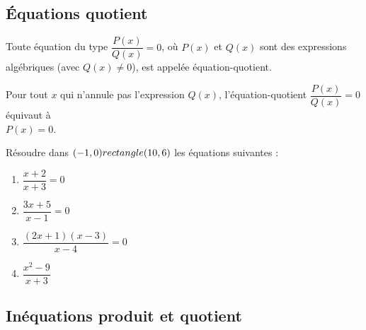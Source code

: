 \newpage

\subsection{Équations quotient}

\begin{Définition}
Toute équation du type $\dfrac{P(x)}{Q(x)} = 0$, où $P(x)$ et $ Q(x)$ sont des expressions algébriques (avec $Q(x) \neq 0$), est appelée équation-quotient.
\end{Définition}

\begin{Propriété}
Pour tout $x$ qui n'annule pas l'expression $Q(x)$, l'équation-quotient $\dfrac{P(x)}{Q(x)}= 0$ équivaut à \\
$P(x) = 0$.

\end{Propriété}

\begin{Exemple}
Résoudre dans $(-1,0) rectangle (10,6)$ les équations suivantes :
\begin{enumerate}
\item $\dfrac{x+2}{x+3} = 0 $ \ligne

\ligne

\ligne

\item $\dfrac{3x+5}{x-1}=0$ \ligne

\ligne

\ligne

\item $\dfrac{(2x+1)(x-3)}{x-4}=0$ \ligne

\ligne

\ligne

\ligne

\ligne

\ligne

\item $\dfrac{x^2-9}{x+3}$ \ligne

\ligne

\ligne

\end{enumerate}

\end{Exemple}
\newpage
\subsection{Inéquations produit et quotient}

